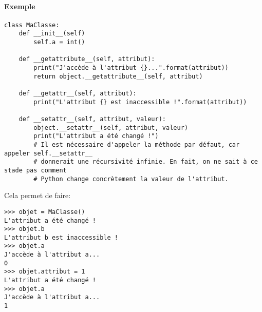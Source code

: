 \paragraph{Exemple}
\begin{verbatim}
class MaClasse:
    def __init__(self)
        self.a = int()

    def __getattribute__(self, attribut):
        print("J'accède à l'attribut {}...".format(attribut))
        return object.__getattribute__(self, attribut)

    def __getattr__(self, attribut):
        print("L'attribut {} est inaccessible !".format(attribut))

    def __setattr__(self, attribut, valeur):
        object.__setattr__(self, attribut, valeur)
        print("L'attribut a été changé !")
        # Il est nécessaire d'appeler la méthode par défaut, car appeler self.__setattr__
        # donnerait une récursivité infinie. En fait, on ne sait à ce stade pas comment
        # Python change concrètement la valeur de l'attribut.
\end{verbatim}

Cela permet de faire:
\begin{verbatim}
>>> objet = MaClasse()
L'attribut a été changé !
>>> objet.b
L'attribut b est inaccessible !
>>> objet.a
J'accède à l'attribut a...
0
>>> objet.attribut = 1
L'attribut a été changé !
>>> objet.a
J'accède à l'attribut a...
1
\end{verbatim}

